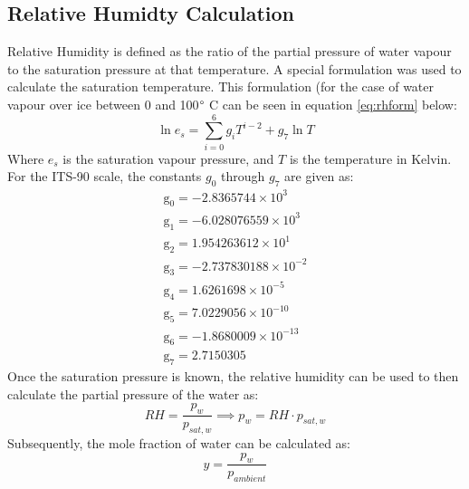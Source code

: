 \documentclass[11pt,a4paper,twoside,oneside]{article}
\begin{document}
\subsection{Relative Humidty Calculation}\label{app:rh}
\vspace{0.3cm}
Relative Humidity is defined as the ratio of the partial pressure of water vapour to the saturation pressure at that temperature. A special formulation\cite{its90} was used to calculate the saturation temperature. This formulation (for the case of water vapour over ice between 0 and 100$\degree$ C can be seen in equation \ref{eq:rhform} below:
\begin{equation}\label{eq:rhform}
    \ln e_{s}=\sum_{i=0}^{6} g_{i} T^{i-2}+g_{7} \ln T
\end{equation}
Where $e_s$ is the saturation vapour pressure, and $T$ is the temperature in Kelvin. For the ITS-90 scale, the constants $g_0$ through $g_7$ are given as:
$$\begin{array}{l}
\mathrm{g}_{0}=-2.8365744 \times 10^{3} \\
\mathrm{g}_{1}=-6.028076559 \times 10^{3} \\
\mathrm{g}_{2}=1.954263612 \times 10^{1} \\
\mathrm{g}_{3}=-2.737830188 \times 10^{-2} \\
\mathrm{g}_{4}=1.6261698 \times 10^{-5} \\
\mathrm{g}_{5}=7.0229056 \times 10^{-10} \\
\mathrm{g}_{6}=-1.8680009 \times 10^{-13} \\
\mathrm{g}_{7}=2.7150305
\end{array}$$
Once the saturation pressure is known, the relative humidity can be used to then calculate the partial pressure of the water as:$$RH=\frac{p_w}{p_{sat,w}}\implies p_w=RH\cdot p_{sat,w}$$
Subsequently, the mole fraction of water can be calculated as:
$$y=\frac{p_w}{p_{ambient}}$$





\clearpage





\printbibliography
\end{document}
